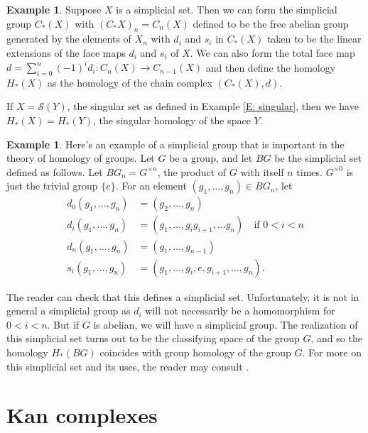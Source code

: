 \documentclass[12pt]{article}
\theoremstyle{plain}
\theoremstyle{definition}
\newtheorem{example}[theorem]{Example}
\newcommand{\ms}[1]{\mathscr{#1}}
\begin{document}
\begin{example}
Suppose $X$ is a simplicial set. Then we can form the simplicial group $C_*(X)$ with $(C_*X)_n=C_n(X)$ defined to be the free abelian group generated by the elements of $X_n$ with $d_i$ and $s_i$ in $C_*(X)$ taken to be the linear extensions of the face maps $d_i$ and $s_i$ of $X$. We can also form the total face map $d =\displaystyle \sum_{i=0}^n (-1)^id_i\colon C_n(X)\to C_{n-1}(X)$ and  then define the homology $H_*(X)$ as the homology of the chain complex $(C_*(X),d)$.


If $X=\ms S(Y)$, the singular set as defined in Example \ref{E: singular}, then we have $H_*(X)=H_*(Y)$, the singular homology of the space $Y$.
\end{example}





\begin{example}
Here's an example of a simplicial group that is important in the theory of homology of groups. Let $G$ be a group, and let $BG$ be the simplicial set defined as follows. Let $BG_n=G^{\times n}$, the product of $G$ with itself $n$ times. $G^{\times 0}$ is just the trivial group $\{e\}$. For an element $(g_1,\ldots,g_n)\in BG_n$, let 
\begin{align*}
d_0(g_1,\ldots, g_n)&= (g_2,\ldots, g_n)\\
d_i(g_1,\ldots, g_n)&= (g_1,\ldots, g_ig_{i+1},\ldots g_n)\quad\text{if $0<i<n$}\\
d_n(g_1,\ldots, g_n)&= (g_1,\ldots, g_{n-1})\\
s_i(g_1,\ldots, g_n)&= (g_1,\ldots,g_i,e,g_{i+1},\ldots, g_n).
\end{align*}
\end{example}


The reader can check that this defines a simplicial set. Unfortunately, it is not in general a simplicial group as $d_i$ will not necessarily be a homomorphism for $0<i<n$. But if $G$ is abelian, we will have a simplicial group. 
The realization of this simplicial set turns out to be  the classifying space of the group $G$, and so the homology $H_*(BG)$ coincides with group homology of the group $G$. For more on this simplicial set and its uses, the reader may consult \cite[Chapter 8]{WEIB}. 








\section{Kan complexes}\label{S: Kan}
\end{document}
